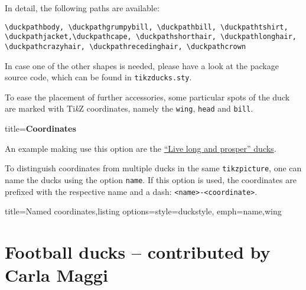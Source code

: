 \documentclass[parskip=half]{scrartcl}
\newcommand{\TikZ}{Ti\emph{k}Z\xspace}
\begin{document}
In detail, the following paths are available:

\begin{lstlisting}[aboveskip=1.2em,breakindent=0pt]
\duckpathbody, \duckpathgrumpybill, \duckpathbill, \duckpathtshirt, \duckpathjacket,\duckpathcape, \duckpathshorthair, \duckpathlonghair, \duckpathcrazyhair, \duckpathrecedinghair, \duckpathcrown
\end{lstlisting}

In case one of the other shapes is needed, please have a look at the package source code, which can be found in \lstinline|tikzducks.sty|.

To ease the placement of further accessories, some particular spots of the duck are marked with \TikZ coordinates, namely the \lstinline|wing|, \lstinline|head| and \lstinline|bill|. 

{
\footnotesize\ttfamily
\begin{tcblisting}{title={\normalfont\normalsize\bfseries Coordinates}}
\end{tcblisting}
}
An example making use this option are the \hyperref[starducks]{``Live long and prosper'' ducks}. 

To distinguish coordinates from multiple ducks in the same \lstinline|tikzpicture|, one can name the ducks using the option \lstinline[emph={name}]|name|. If this option is used, the coordinates are prefixed with the respective name and a dash: \lstinline|<name>-<coordinate>|.

\begin{tcblisting}{title={Named coordinates},listing options={style={duckstyle}, emph={name,wing}}}
\end{tcblisting}

\clearpage
\section{Football ducks -- contributed by Carla Maggi}
\label{sec:footballducks}
\end{document}
